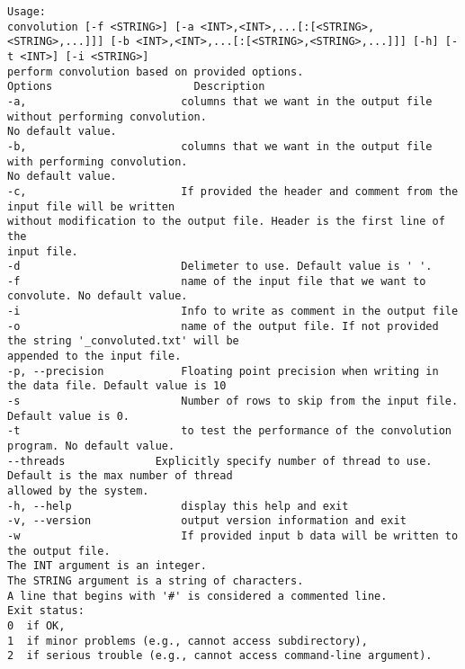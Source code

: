 \begin{lstlisting}
Usage:
convolution [-f <STRING>] [-a <INT>,<INT>,...[:[<STRING>,<STRING>,...]]] [-b <INT>,<INT>,...[:[<STRING>,<STRING>,...]]] [-h] [-t <INT>] [-i <STRING>]
perform convolution based on provided options.
Options                      Description
-a,                        columns that we want in the output file without performing convolution.
No default value.
-b,                        columns that we want in the output file with performing convolution.
No default value.
-c,                        If provided the header and comment from the input file will be written
without modification to the output file. Header is the first line of the
input file.
-d                         Delimeter to use. Default value is ' '.
-f                         name of the input file that we want to convolute. No default value.
-i                         Info to write as comment in the output file
-o                         name of the output file. If not provided the string '_convoluted.txt' will be
appended to the input file.
-p, --precision            Floating point precision when writing in the data file. Default value is 10
-s                         Number of rows to skip from the input file. Default value is 0.
-t                         to test the performance of the convolution program. No default value.
--threads              Explicitly specify number of thread to use. Default is the max number of thread
allowed by the system.
-h, --help                 display this help and exit
-v, --version              output version information and exit
-w                         If provided input b data will be written to the output file.
The INT argument is an integer.
The STRING argument is a string of characters.
A line that begins with '#' is considered a commented line.
Exit status:
0  if OK,
1  if minor problems (e.g., cannot access subdirectory),
2  if serious trouble (e.g., cannot access command-line argument).
\end{lstlisting}
